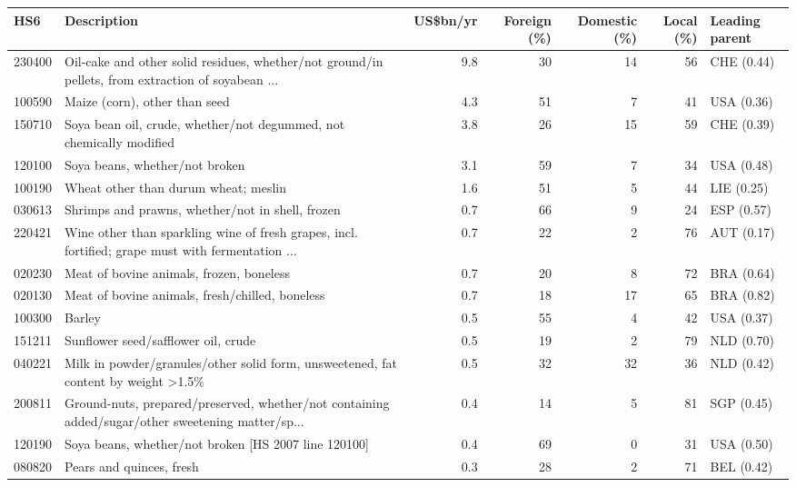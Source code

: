 \begin{tabular}{@{}l p{6.4cm} r r r r l@{}}
\toprule
HS6 & Description & US\$bn/yr & Foreign (\%) & Domestic (\%) & Local (\%) & Leading parent \\
\midrule
230400 & Oil-cake and other solid residues, whether/\allowbreak{}not ground/\allowbreak{}in pellets, from extraction of soyabean ... & 9.8 & 30 & 14 & 56 & CHE (0.44) \\
100590 & Maize (corn), other than seed & 4.3 & 51 & 7 & 41 & USA (0.36) \\
150710 & Soya bean oil, crude, whether/\allowbreak{}not degummed, not chemically modified & 3.8 & 26 & 15 & 59 & CHE (0.39) \\
120100 & Soya beans, whether/\allowbreak{}not broken & 3.1 & 59 & 7 & 34 & USA (0.48) \\
100190 & Wheat other than durum wheat; meslin & 1.6 & 51 & 5 & 44 & LIE (0.25) \\
030613 & Shrimps and prawns, whether/\allowbreak{}not in shell, frozen & 0.7 & 66 & 9 & 24 & ESP (0.57) \\
220421 & Wine other than sparkling wine of fresh grapes, incl. fortified; grape must with fermentation ... & 0.7 & 22 & 2 & 76 & AUT (0.17) \\
020230 & Meat of bovine animals, frozen, boneless & 0.7 & 20 & 8 & 72 & BRA (0.64) \\
020130 & Meat of bovine animals, fresh/\allowbreak{}chilled, boneless & 0.7 & 18 & 17 & 65 & BRA (0.82) \\
100300 & Barley & 0.5 & 55 & 4 & 42 & USA (0.37) \\
151211 & Sunflower seed/\allowbreak{}safflower oil, crude & 0.5 & 19 & 2 & 79 & NLD (0.70) \\
040221 & Milk in powder/\allowbreak{}granules/\allowbreak{}other solid form, unsweetened, fat content by weight >1.5\% & 0.5 & 32 & 32 & 36 & NLD (0.42) \\
200811 & Ground-nuts, prepared/\allowbreak{}preserved, whether/\allowbreak{}not containing added/\allowbreak{}sugar/\allowbreak{}other sweetening matter/\allowbreak{}sp... & 0.4 & 14 & 5 & 81 & SGP (0.45) \\
120190 & Soya beans, whether/\allowbreak{}not broken [HS 2007 line 120100] & 0.4 & 69 & 0 & 31 & USA (0.50) \\
080820 & Pears and quinces, fresh & 0.3 & 28 & 2 & 71 & BEL (0.42) \\
\bottomrule
\end{tabular}
